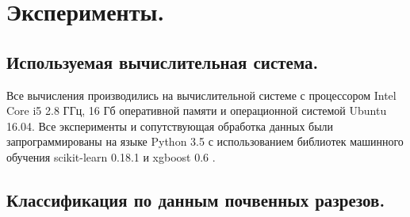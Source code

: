 \documentclass[14pt]{extarticle}
\begin{document}
\section{Эксперименты.}

\subsection{Используемая вычислительная система.}

Все вычисления производились на вычислительной системе с процессором Intel Core i5 2.8 ГГц,
16 Гб оперативной памяти и операционной системой Ubuntu 16.04. Все эксперименты и
сопутствующая обработка данных были запрограммированы на языке Python 3.5 
\cite{python} с использованием
библиотек машинного обучения scikit-learn 0.18.1 \cite{sklearn} и 
xgboost 0.6 \cite{xgboost}.

\subsection{Классификация по данным почвенных разрезов.}
\end{document}
